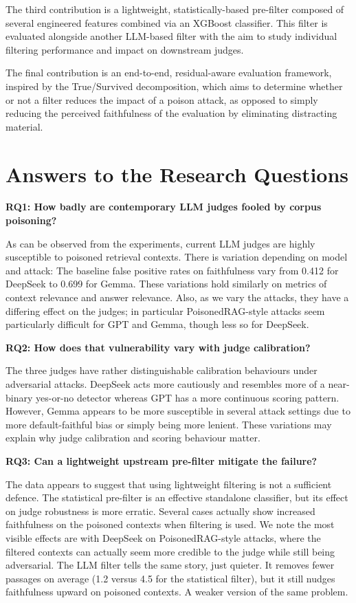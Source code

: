 The third contribution is a lightweight, statistically-based pre-filter composed of several engineered features combined via an XGBoost classifier. This filter is evaluated alongside another LLM-based filter with the aim to study individual filtering performance and impact on downstream judges.

The final contribution is an end-to-end, residual-aware evaluation framework, inspired by the True/Survived decomposition, which aims to determine whether or not a filter reduces the impact of a poison attack, as opposed to simply reducing the perceived faithfulness of the evaluation by eliminating distracting material.


\section{Answers to the Research Questions}

\textbf{RQ1: How badly are contemporary LLM judges fooled by corpus poisoning?}

As can be observed from the experiments, current LLM judges are highly susceptible to poisoned retrieval contexts. There is variation depending on model and attack: The baseline false positive rates on faithfulness vary from 0.412 for DeepSeek to 0.699 for Gemma. These variations hold similarly on metrics of context relevance and answer relevance. Also, as we vary the attacks, they have a differing effect on the judges; in particular PoisonedRAG-style attacks seem particularly difficult for GPT and Gemma, though less so for DeepSeek.

\textbf{RQ2: How does that vulnerability vary with judge calibration?}

The three judges have rather distinguishable calibration behaviours under adversarial attacks. DeepSeek acts more cautiously and resembles more of a near-binary yes-or-no detector whereas GPT has a more continuous scoring pattern. However, Gemma appears to be more susceptible in several attack settings due to more default-faithful bias or simply being more lenient. These variations may explain why judge calibration and scoring behaviour matter.

\textbf{RQ3: Can a lightweight upstream pre-filter mitigate the failure?}

The data appears to suggest that using lightweight filtering is not a sufficient defence. The statistical pre-filter is an effective standalone classifier, but its effect on judge robustness is more erratic. Several cases actually show increased faithfulness on the poisoned contexts when filtering is used. We note the most visible effects are with DeepSeek on PoisonedRAG-style attacks, where the filtered contexts can actually seem more credible to the judge while still being adversarial. The LLM filter tells the same story, just quieter. It removes fewer passages on average (1.2 versus 4.5 for the statistical filter), but it still nudges faithfulness upward on poisoned contexts. A weaker version of the same problem.

